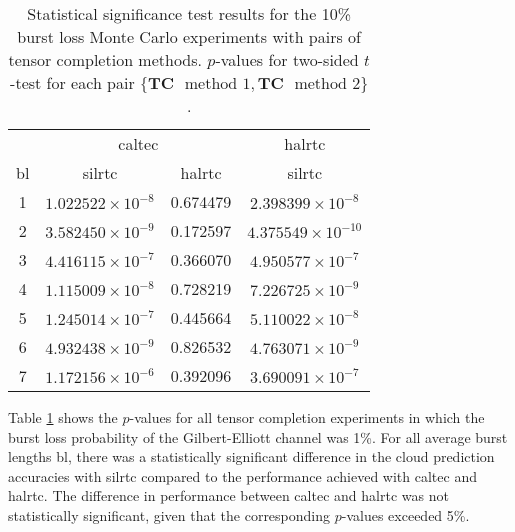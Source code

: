 \begin{table}[H]
	\caption[Statistical significance results for the 10\% burst loss scenario with no tensor completion]{Statistical significance test results for the 10\% burst loss Monte Carlo experiments with pairs of tensor completion methods. $p$-values for two-sided $t$-test for each pair $\{\textbf{TC} \mbox{ } \text{method 1},\textbf{TC} \mbox{ } \text{method 2}\}$.} \label{table:expts:ttest:tc:0.01}
	\centering
	\begin{adjustbox}{max width = \textwidth}
		\begin{tabular}{|c|cc|c|}
			\hline
			\multicolumn{1}{|c|}{} &
			\multicolumn{2}{c|}{\gls{caltec}} & \multicolumn{1}{c|}{\gls{halrtc}} \\
			\gls{bl} &  \gls{silrtc} &  \gls{halrtc} &  \gls{silrtc} \\
			\hline \hline 
			1 &   $1.022522 \times 10^{-8}$ &      \cellcolor{red!40} 0.674479 &   $2.398399 \times 10^{-8}$ \\
			2 &   $3.582450 \times 10^{-9}$ &   \cellcolor{red!40}    0.172597 &   $4.375549 \times 10^{-10}$ \\
			3 &   $4.416115 \times 10^{-7}$ &    \cellcolor{red!40}   0.366070 &   $4.950577 \times 10^{-7}$ \\
			4 &   $1.115009 \times 10^{-8}$ &    \cellcolor{red!40}   0.728219 &   $7.226725 \times 10^{-9}$ \\
			5 &   $1.245014 \times 10^{-7}$ &  \cellcolor{red!40}     0.445664 &   $5.110022\times10^{-8}$ \\
			6 &   $4.932438 \times 10^{-9}$ &    \cellcolor{red!40}   0.826532 &   $4.763071 \times 10^{-9}$ \\
			7 &   $1.172156 \times 10^{-6}$ &    \cellcolor{red!40}   0.392096 &   $3.690091 \times 10^{-7}$ \\
			\hline
		\end{tabular}%
	\end{adjustbox}
\end{table}

Table \ref{table:expts:ttest:tc:0.01} shows the $p$-values for all tensor completion experiments in which the burst loss probability of the Gilbert-Elliott channel was 1\%. For all average burst lengths \gls{bl}, there was a statistically significant difference in the cloud prediction accuracies with \gls{silrtc} compared to the performance achieved with \gls{caltec} and \gls{halrtc}. The difference in performance between \gls{caltec} and \gls{halrtc} was not statistically significant, given that the corresponding $p$-values exceeded 5\%.

